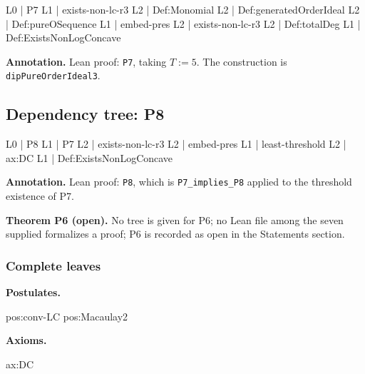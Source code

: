 \documentclass[11pt,reqno]{amsart}
\begin{document}
\noindent%
\begin{minipage}[t]{0.48\linewidth}
	\vspace{0pt}
	\begin{verbatimbox}
		L0 | P7
		L1 |   exists-non-lc-r3
		L2 |     Def:Monomial
		L2 |     Def:generatedOrderIdeal
		L2 |     Def:pureOSequence
		L1 |   embed-pres
		L2 |     exists-non-lc-r3
		L2 |     Def:totalDeg
		L1 |   Def:ExistsNonLogConcave
	\end{verbatimbox}
\end{minipage}\hfill 
\begin{minipage}[t]{0.48\linewidth}
	\vspace{0pt}
	\textbf{Annotation.} Lean proof: \texttt{P7}, taking $T:=5$. The construction is \texttt{dipPureOrderIdeal3}.
\end{minipage}

\medskip

\subsection*{Dependency tree: \textsf{P8}}

\noindent%
\begin{minipage}[t]{0.48\linewidth}
	\vspace{0pt}
	\begin{verbatimbox}
		L0 | P8
		L1 |   P7
		L2 |     exists-non-lc-r3
		L2 |     embed-pres
		L1 |   least-threshold
		L2 |     ax:DC
		L1 |   Def:ExistsNonLogConcave
	\end{verbatimbox}
\end{minipage}\hfill 
\begin{minipage}[t]{0.48\linewidth}
	\vspace{0pt}
	\textbf{Annotation.} Lean proof: \texttt{P8}, which is \texttt{P7\_implies\_P8} applied to the threshold existence of P7.
\end{minipage}

\medskip

\noindent\textbf{Theorem P6 (open).} No tree is given for P6; no Lean file
among the seven supplied formalizes a proof; P6 is recorded as open in the
Statements section.

\medskip

\subsubsection*{Complete leaves}

\noindent%
\begin{minipage}[t]{0.48\linewidth}
	\vspace{0pt}
	\textbf{Postulates.}
	\smallskip
	\begin{verbatimbox}
		pos:conv-LC
		pos:Macaulay2
	\end{verbatimbox}
\end{minipage}\hfill 
\begin{minipage}[t]{0.48\linewidth}
	\vspace{0pt}
	\textbf{Axioms.}
	\smallskip
	\begin{verbatimbox}
		ax:DC
	\end{verbatimbox}
\end{minipage}
\end{document}
